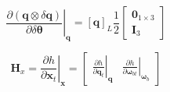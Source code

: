 \documentclass[11pt,a4paper]{scrartcl}
\renewcommand\vec{\bm}
\newcommand{\quat}[1]{\mathbf{#1}}
\newcommand{\Matrix}[1]{\mathbf{#1}}
\newcommand{\qprod}{\otimes}
\begin{document}
\begin{equation}
	\left.\frac{\partial \left( \quat{q} \qprod \delta \quat{q} \right)}{\partial \delta \vec{\theta}}\right|_{\vec{q}}
	=
	\left[\quat{q}\right]_L \frac{1}{2}
	\begin{bmatrix}
	\Matrix{0}_{1 \times 3} \\ \Matrix{I}_3
	\end{bmatrix}
\end{equation}

\begin{equation}
	\Matrix{H}_x = \left. \frac{\partial h}{\partial \vec{x}_t} \right|_{\vec{x}}
	=
	\begin{bmatrix}
		\left.\frac{\partial h}{\partial \quat{q}_t}\right|_{\quat{q}} &
		\left.\frac{\partial h}{\partial \vec{\omega}_{bt}}\right|_{\vec{\omega}_b}
	\end{bmatrix}
\end{equation}
\end{document}
